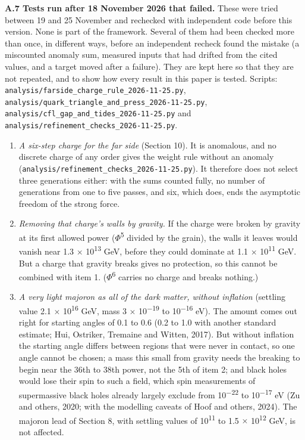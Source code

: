 \documentclass[
  11pt,
]{article}
\providecommand{\tightlist}{%
  \setlength{\itemsep}{0pt}\setlength{\parskip}{0pt}}
\begin{document}
\textbf{A.7 Tests run after 18 November 2026 that failed.} These were tried between 19 and 25 November and rechecked with independent code before this version. None is part of the framework. Several of them had been checked more than once, in different ways, before an independent recheck found the mistake (a miscounted anomaly sum, measured inputs that had drifted from the cited values, and a target moved after a failure). They are kept here so that they are not repeated, and to show how every result in this paper is tested. Scripts: \texttt{analysis/farside\_charge\_rule\_2026-11-25.py}, \texttt{analysis/quark\_triangle\_and\_press\_2026-11-25.py}, \texttt{analysis/cfl\_gap\_and\_tides\_2026-11-25.py} and \texttt{analysis/refinement\_checks\_2026-11-25.py}.

\begin{enumerate}
\def\labelenumi{\arabic{enumi}.}
\tightlist
\item
  \emph{A six-step charge for the far side} (Section 10). It is anomalous, and no discrete charge of any order gives the weight rule without an anomaly (\texttt{analysis/refinement\_checks\_2026-11-25.py}). It therefore does not select three generations either: with the sums counted fully, no number of generations from one to five passes, and six, which does, ends the asymptotic freedom of the strong force.
\item
  \emph{Removing that charge's walls by gravity.} If the charge were broken by gravity at its first allowed power (\ensuremath{\Phi}\textsuperscript{5} divided by the grain), the walls it leaves would vanish near 1.3 \ensuremath{\times} 10\textsuperscript{13} GeV, before they could dominate at 1.1 \ensuremath{\times} 10\textsuperscript{11} GeV. But a charge that gravity breaks gives no protection, so this cannot be combined with item 1. (\ensuremath{\Phi}\textsuperscript{6} carries no charge and breaks nothing.)
\item
  \emph{A very light majoron as all of the dark matter, without inflation} (settling value 2.1 \ensuremath{\times} 10\textsuperscript{16} GeV, mass 3 \ensuremath{\times} 10\textsuperscript{\ensuremath{-}19} to 10\textsuperscript{\ensuremath{-}16} eV). The amount comes out right for starting angles of 0.1 to 0.6 (0.2 to 1.0 with another standard estimate; Hui, Ostriker, Tremaine and Witten, 2017). But without inflation the starting angle differs between regions that were never in contact, so one angle cannot be chosen; a mass this small from gravity needs the breaking to begin near the 36th to 38th power, not the 5th of item 2; and black holes would lose their spin to such a field, which spin measurements of supermassive black holes already largely exclude from 10\textsuperscript{\ensuremath{-}22} to 10\textsuperscript{\ensuremath{-}17} eV (Zu and others, 2020; with the modelling caveats of Hoof and others, 2024). The majoron lead of Section 8, with settling values of 10\textsuperscript{11} to 1.5 \ensuremath{\times} 10\textsuperscript{12} GeV, is not affected.

\end{enumerate}
\end{document}
